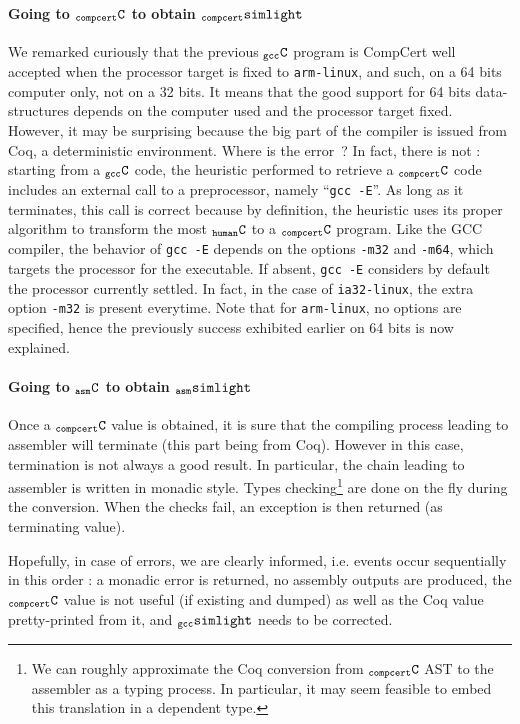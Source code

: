 \documentclass[a4paper, 11pt]{article}
\newcommand{\ccert}{CompCert\xspace}
\newcommand{\gccSL}{$_{\tt gcc}{\tt simlight}$\xspace}
\newcommand{\cSL}{$_{\tt compcert}{\tt simlight}$\xspace}
\newcommand{\aSL}{$_{\tt asm}{\tt simlight}$\xspace} %
\newcommand{\C}{$_{\tt compcert}{\tt C}$\xspace}
\newcommand{\gccC}{$_{\tt gcc}{\tt C}$\xspace}
\newcommand{\hC}{$_{\tt human}{\tt C}$\xspace}
\newcommand{\aC}{$_{\tt asm}{\tt C}$\xspace}
\begin{document}
\paragraph{Going to \C to obtain \cSL}
We remarked curiously that the previous \gccC program is \ccert well accepted when the processor target is fixed to \verb|arm-linux|, and such, on a 64 bits computer only, not on a 32 bits. It means that the good support for 64 bits data-structures depends on the computer used and the processor target fixed. However, it may be surprising because the big part of the compiler is issued from Coq, a deterministic environment. Where is the error~? In fact, there is not : starting from a \gccC code, the heuristic performed to retrieve a \C code includes an external call to a preprocessor, namely ``\verb|gcc -E|''. As long as it terminates, this call is correct because by definition, the heuristic uses its proper algorithm to transform the most \hC to a \C program. Like the GCC compiler, the behavior of \verb|gcc -E| depends on the options \verb|-m32| and \verb|-m64|, which targets the processor for the executable. If absent, \verb|gcc -E| considers by default the processor currently settled. In fact, in the case of \verb|ia32-linux|, the extra option \verb|-m32| is present everytime.
Note that for \verb|arm-linux|, no options are specified, hence the previously success exhibited earlier on 64 bits is now explained.

\paragraph{Going to \aC to obtain \aSL}
Once a \C value is obtained, it is sure that the compiling process leading to assembler will terminate (this part being from Coq). However in this case, termination is not always a good result. In particular, the chain leading to assembler is written in monadic style. Types checking\footnote{We can roughly approximate the Coq conversion from \C AST to the assembler as a typing process. In particular, it may seem feasible to embed this translation in a dependent type.} are done on the fly during the conversion. When the checks fail, an exception is then returned (as terminating value).

Hopefully, in case of errors, we are clearly informed, i.e. events occur sequentially in this order : a monadic error is returned, no assembly outputs are produced, the \C value is not useful (if existing and dumped) as well as the Coq value pretty-printed from it, and \gccSL needs to be corrected.
\end{document}

